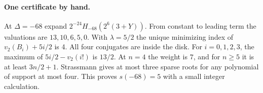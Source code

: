 \paragraph{One certificate by hand.}
At $\Delta=-68$ expand $2^{-24}H_{-68}(2^6(3+Y))$. From constant to leading term the valuations are $13,10,6,5,0$. With $\lambda=5/2$ the unique minimizing index of $v_2(B_i)+5i/2$ is 4. All four conjugates are inside the disk. For $i=0,1,2,3$, the maximum of $5i/2-v_2(i!)$ is $13/2$. At $n=4$ the weight is $7$, and for $n\ge5$ it is at least $3n/2+1$. Strassmann gives at most three sparse roots for any polynomial of support at most four. This proves $s(-68)=5$ with a small integer calculation.



